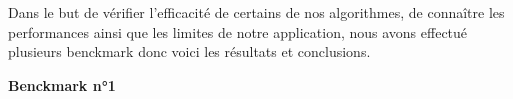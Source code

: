 Dans le but de vérifier l'efficacité de certains de nos algorithmes, de connaître les performances ainsi que les limites de notre application, nous avons effectué plusieurs benckmark donc voici les résultats et conclusions.

\textbf{Benckmark n°1}
